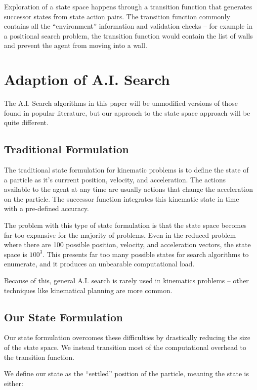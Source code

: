 Exploration of a state space happens through a transition function that generates successor states from state action pairs. The transition function commonly contains all the ``environment'' information and validation checks -- for example in a positional search problem, the transition function would contain the list of walls and prevent the agent from moving into a wall.

\section{Adaption of A.I. Search}

The A.I. Search algorithms in this paper will be unmodified versions of those found in popular literature, but our approach to the state space approach will be quite different.

	\subsection{Traditional Formulation}

The traditional state formulation for kinematic problems is to define the state of a particle as it's currrent position, velocity, and acceleration. The actions available to the agent at any time are usually actions that change the acceleration on the particle. The successor function integrates this kinematic state in time with a pre-defined accuracy.

The problem with this type of state formulation is that the state space becomes far too expansive for the majority of problems. Even in the reduced problem where there are 100 possible position, velocity, and acceleration vectors, the state space is $100^3$. This presents far too many possible states for search algorithms to enumerate, and it produces an unbearable computational load.

Because of this, general A.I. search is rarely used in kinematics problems -- other techniques like kinematical planning are more common.

	\subsection{Our State Formulation}

Our state formulation overcomes these difficulties by drastically reducing the size of the state space. We instead transition most of the computational overhead to the transition function.

We define our state as the ``settled'' position of the particle, meaning the state is either:

